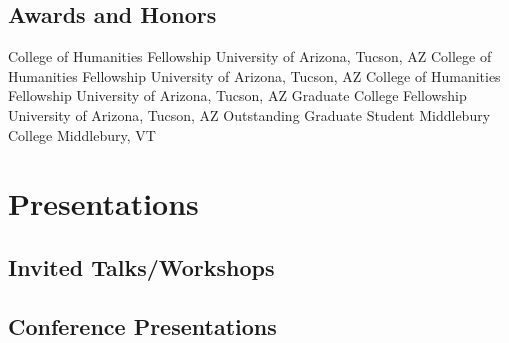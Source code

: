 \documentclass[12pt,letterpaper]{moderncv}
\begin{document}
\subsection{Awards and Honors}

        {College of Humanities Fellowship}
        {}
        {}
        {}
        {University of Arizona, Tucson, AZ}
        {College of Humanities Fellowship}
        {}
        {}
        {}
        {University of Arizona, Tucson, AZ}
        {College of Humanities Fellowship}
        {}
        {}
        {}
        {University of Arizona, Tucson, AZ}
        {Graduate College Fellowship}
        {}
        {}
        {}
        {University of Arizona, Tucson, AZ}
        {Outstanding Graduate Student}
        {Middlebury College}
        {Middlebury, VT}
        {}
        {}
        {}













\section{Presentations}

\subsection{Invited Talks/Workshops}

\subsection{Conference Presentations}
\end{document}
